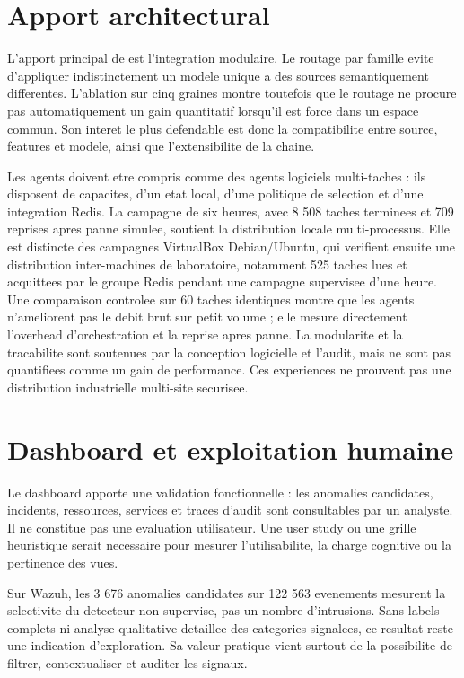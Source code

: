 \section{Apport architectural}
L'apport principal de \logminer{} est l'integration modulaire. Le routage par famille evite d'appliquer indistinctement un modele unique a des sources semantiquement differentes. L'ablation sur cinq graines montre toutefois que le routage ne procure pas automatiquement un gain quantitatif lorsqu'il est force dans un espace commun. Son interet le plus defendable est donc la compatibilite entre source, features et modele, ainsi que l'extensibilite de la chaine.

Les agents doivent etre compris comme des agents logiciels multi-taches : ils disposent de capacites, d'un etat local, d'une politique de selection et d'une integration Redis. La campagne de six heures, avec 8 508 taches terminees et 709 reprises apres panne simulee, soutient la distribution locale multi-processus. Elle est distincte des campagnes VirtualBox Debian/Ubuntu, qui verifient ensuite une distribution inter-machines de laboratoire, notamment 525 taches lues et acquittees par le groupe Redis pendant une campagne supervisee d'une heure. Une comparaison controlee sur 60 taches identiques montre que les agents n'ameliorent pas le debit brut sur petit volume ; elle mesure directement l'overhead d'orchestration et la reprise apres panne. La modularite et la tracabilite sont soutenues par la conception logicielle et l'audit, mais ne sont pas quantifiees comme un gain de performance. Ces experiences ne prouvent pas une distribution industrielle multi-site securisee.

\section{Dashboard et exploitation humaine}
Le dashboard apporte une validation fonctionnelle : les anomalies candidates, incidents, ressources, services et traces d'audit sont consultables par un analyste. Il ne constitue pas une evaluation utilisateur. Une user study ou une grille heuristique serait necessaire pour mesurer l'utilisabilite, la charge cognitive ou la pertinence des vues.

Sur Wazuh, les 3 676 anomalies candidates sur 122 563 evenements mesurent la selectivite du detecteur non supervise, pas un nombre d'intrusions. Sans labels complets ni analyse qualitative detaillee des categories signalees, ce resultat reste une indication d'exploration. Sa valeur pratique vient surtout de la possibilite de filtrer, contextualiser et auditer les signaux.

